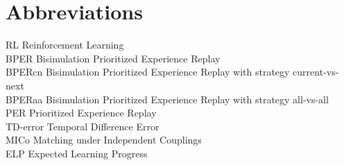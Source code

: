 
\chapter*{Abbreviations}

\begin{flushleft}

RL \hfill  Reinforcement Learning \\
BPER \hfill Bisimulation Prioritized Experience Replay \\
BPERcn \hfill Bisimulation Prioritized Experience Replay with strategy current-vs-next \\
BPERaa \hfill Bisimulation Prioritized Experience Replay with strategy all-vs-all \\
PER \hfill Prioritized Experience Replay \\
TD-error \hfill Temporal Difference Error \\
MICo \hfill Matching under Independent Couplings \\
ELP \hfill Expected Learning Progress \\

\end{flushleft}